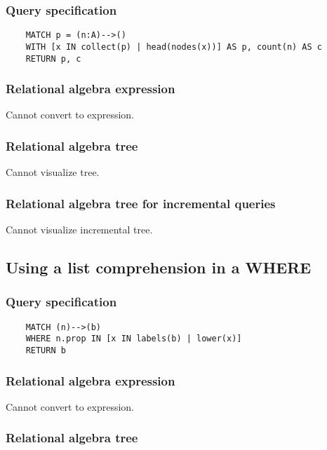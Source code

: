 	\subsubsection*{Query specification}

	\begin{lstlisting}
	MATCH p = (n:A)-->()
	WITH [x IN collect(p) | head(nodes(x))] AS p, count(n) AS c
	RETURN p, c
	\end{lstlisting}


	\subsubsection*{Relational algebra expression}

	Cannot convert to expression.

	\subsubsection*{Relational algebra tree}

	Cannot visualize tree.

	\subsubsection*{Relational algebra tree for incremental queries}

	Cannot visualize incremental tree.
	\subsection{Using a list comprehension in a WHERE}

	\subsubsection*{Query specification}

	\begin{lstlisting}
	MATCH (n)-->(b)
	WHERE n.prop IN [x IN labels(b) | lower(x)]
	RETURN b
	\end{lstlisting}


	\subsubsection*{Relational algebra expression}

	Cannot convert to expression.

	\subsubsection*{Relational algebra tree}

